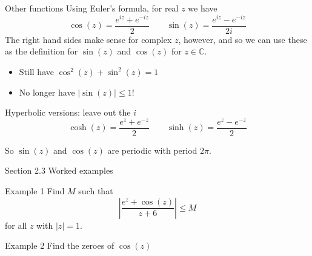 \documentclass{beamer}
\newcommand{\C}{\mathbb{C}}
\begin{document}
\begin{frame}{Other functions}
Using Euler's formula, for real $z$ we have
$$\cos(z)=\frac{e^{iz}+e^{-iz}}{2} \quad \quad \sin(z)=\frac{e^{iz}-e^{-iz}}{2i}$$
The right hand sides make sense for complex $z$, however, and so we can use these as the definition for $\sin(z)$ and $\cos(z)$ for $z\in\C$.
\begin{itemize}
    \item Still have $\cos^2(z)+\sin^2(z)=1$
    \item No longer have $|\sin(z)|\leq 1$!
\end{itemize}
\begin{block}{Hyperbolic versions: leave out the $i$}
$$\cosh(z)=\frac{e^{z}+e^{-z}}{2} \quad \quad \sinh(z)=\frac{e^{z}-e^{-z}}{2}$$
\end{block}
So $\sin(z)$ and $\cos(z)$ are periodic with period $2\pi$.
\end{frame}

\begin{frame}{Section 2.3 Worked examples}
\begin{block}{Example 1}
Find $M$ such that 
$$\left| \frac{e^z+\cos(z)}{z+6}\right| \leq M$$
for all $z$ with $|z|=1$.
\end{block}
\begin{block}{Example 2}
Find the zeroes of $\cos(z)$
\end{block}
\end{frame}
\end{document}
